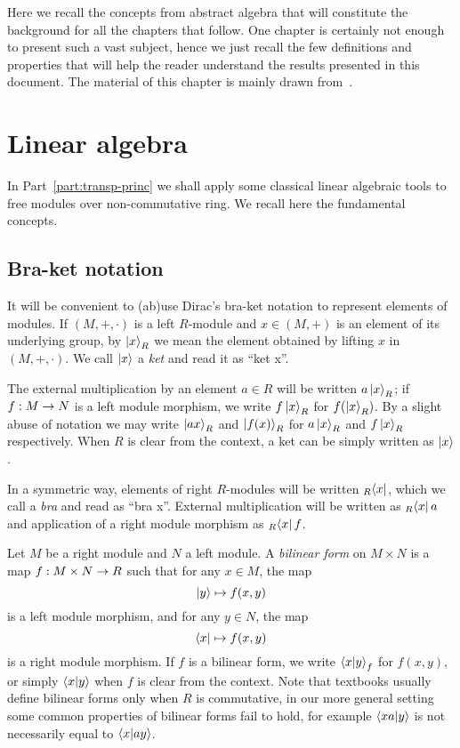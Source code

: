 

Here we recall the concepts from abstract algebra that will constitute
the background for all the chapters that follow. One chapter is
certainly not enough to present such a vast subject, hence we just
recall the few definitions and properties that will help the reader
understand the results presented in this document. The material of
this chapter is mainly drawn
from~\cite{lang,lidl+niederreiter:2,silverman:elliptic}.

\section{Linear algebra}
\label{sec:linear-algebra}
In Part~\ref{part:transp-princ} we shall apply some classical linear
algebraic tools to free modules over non-commutative ring. We recall
here the fundamental concepts.


\subsection{Bra-ket notation}
\label{sec:linear-algebra:bra-ket}

It will be convenient to (ab)use Dirac's
bra-ket notation to represent elements of
modules. If $(M,+,\cdot)$ is a left $R$-module and $x\in (M,+)$ is an
element of its underlying group, by $\left\lvert x \right\rangle_R$ we mean the element
obtained by lifting $x$ in $(M,+,\cdot)$. We call
$\left\lvert x \right\rangle$ a
\emph{ket} and read it as ``ket x''.

The external multiplication by an element $a\in R$ will be written
$a\left\lvert x \right\rangle_R$; if $f:M\rightarrow N$ is a left module morphism, we write
$f\left\lvert x \right\rangle_R$ for $f(\left\lvert x \right\rangle_R)$. By a slight abuse of notation we may
write $\left\lvert a x \right\rangle_R$ and $\left\lvert f(x) \right\rangle_R$ for $a\left\lvert x \right\rangle_R$ and
$f\left\lvert x \right\rangle_R$ respectively. When $R$ is clear from the context, a ket
can be simply written as $\left\lvert x \right\rangle$.

 In a
symmetric way, elements of right $R$-modules will be written
${}_R\!\left\langle x \right\rvert$, which we call a \emph{bra} and read as
``bra x''. External multiplication will be written as ${}_R\!\left\langle x \right\rvert a$
and application of a right module morphism as ${}_R\!\left\langle x \right\rvert f$.

Let $M$ be a right module and $N$ a left module. A
\emph{bilinear
  form} on
$M\times N$ is a map $f:M\times N\rightarrow R$ such that for any $x\in M$,
the map
\[\left\lvert y \right\rangle\mapsto f(x, y)\]
is a left module morphism, and for any $y\in N$, the map
\[\left\langle x \right\rvert\mapsto f(x, y)\]
is a right module morphism. If $f$ is a bilinear form, we write
$\left\langle x \middle| y \right\rangle_f$ for $f(x,y)$, or simply $\left\langle x \middle| y \right\rangle$ when $f$ is
clear from the context. Note that textbooks usually define bilinear
forms only when $R$ is commutative, in our more general setting some
common properties of bilinear forms fail to hold, for example
$\left\langle xa \middle| y \right\rangle$ is not necessarily equal to $\left\langle x \middle| ay \right\rangle$.

